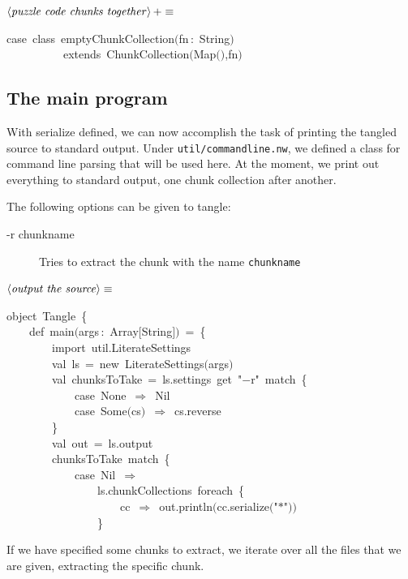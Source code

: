 \documentclass[a4paper,12pt]{article}
\begin{document}
$\left<\mbox{\emph{puzzle code chunks together}}\right>+\equiv$
\begin{program}{\vem case}~{\vem class}~emptyChunkCollection$($fn\,{\rm :}~String$)$
\\~~~~~~~~~~{\vem extends}~ChunkCollection$($Map$($$)$,fn$)$
\\[0.5em]\end{program}
 \subsection{The main program}
With serialize defined, we can now accomplish the task of printing
the tangled source to standard output. Under \texttt{util/commandline.nw},
we defined a class for command line parsing that will be used here.
At the moment, we print out everything to standard output, one chunk
collection after another.

The following options can be given to tangle:

\begin{description}
\item[-r chunkname] Tries to extract the chunk with the name \texttt{chunkname}
\end{description}

$\left<\mbox{\emph{output the source}}\right>\equiv$
\begin{program}{\vem object}~Tangle~{\small\{}
\\~~~~{\vem def}~main$($args\,{\rm :}~Array$[$String$]$$)$~=~{\small\{}
\\~~~~~~~~{\vem import}~util.LiterateSettings
\\[0.5em]~~~~~~~~{\vem val}~ls~=~{\vem new}~LiterateSettings$($args$)$
\\[0.5em]~~~~~~~~{\vem val}~chunksToTake~=~ls.settings~get~"$-$r"~{\vem match}~{\small\{}
\\~~~~~~~~~~~~{\vem case}~None~$\Rightarrow$~Nil
\\~~~~~~~~~~~~{\vem case}~Some$($cs$)$~$\Rightarrow$~cs.reverse
\\~~~~~~~~{\small\}}
\\[0.5em]~~~~~~~~{\vem val}~out~=~ls.output
\\[0.5em]~~~~~~~~chunksToTake~{\vem match}~{\small\{}
\\~~~~~~~~~~~~{\vem case}~Nil~$\Rightarrow$
\\~~~~~~~~~~~~~~~~ls.chunkCollections~foreach~{\small\{}
\\~~~~~~~~~~~~~~~~~~~~cc~$\Rightarrow$~out.println$($cc.serialize$($"$*$"$)$$)$
\\~~~~~~~~~~~~~~~~{\small\}}
\\[0.5em]\end{program}
If we have specified some chunks to extract, we iterate over all the files
that we are given, extracting the specific chunk.
\end{document}
